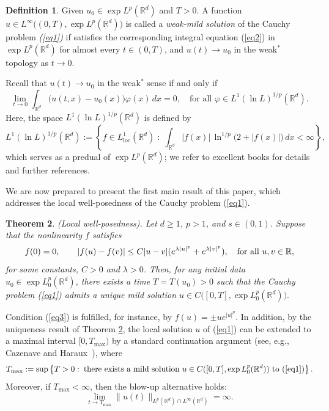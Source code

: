 \documentclass[a4paper,11pt]{amsart}
\renewcommand\eqref[1]{(\ref{#1})} %
\numberwithin{equation}{section}
\theoremstyle{plain}
\newtheorem{theorem}{Theorem}[section]
\theoremstyle{definition}
\newtheorem{definition}[theorem]{Definition}
\begin{document}
\begin{definition}
Given $u_0 \in \exp L^p(\mathbb{R}^d)$ and $T>0$. A function $u \in L^\infty\big((0,T),\exp L^p(\mathbb{R}^d)\big)
$ is called a {\it weak-mild solution} of the Cauchy problem \emph{(\ref{eq1})} if satisfies the corresponding integral equation \eqref{eq2} in $\exp L^p(\mathbb{R}^d)$ for almost every $t\in(0,T)$, and
$u(t) \rightarrow u_0$ in the weak$^{*}$ topology  as $t \to 0$.
\end{definition}
Recall that $u(t)\to u_0$ in the weak$^{*}$ sense if and only if
\[
\lim_{t\to 0}\int_{\mathbb{R}^d}\big(u(t,x)-u_0(x)\big)\varphi(x)\,dx = 0,
\quad \text{for all } \varphi \in L^1(\ln L)^{1/p}(\mathbb{R}^d).
\]
Here, the space $L^1(\ln L)^{1/p}(\mathbb{R}^d)$ is defined by
\[
L^1(\ln L)^{1/p}(\mathbb{R}^d)
:= \left\{ f\in L^1_{\mathrm{loc}}(\mathbb{R}^d) \; : \;
\int_{\mathbb{R}^d} |f(x)|\,\ln^{1/p}\!\big(2+|f(x)|\big)\,dx < \infty \right\},
\]
which serves as a predual of $\exp L^p(\mathbb{R}^d)$; we refer to excellent books \cite{Bennett,Rao} for details and further references. 

We are now prepared to present the first main result of this paper, which addresses the local well-posedness of the Cauchy problem \eqref{eq1}. 
\begin{theorem}\label{theo1}\textup{(Local well-posedness)}. Let $d\ge 1$, $p>1$, and $s \in (0, 1)$. Suppose that the nonlinearity $f$ satisfies
 \begin{equation}\label{eq3}
  f(0)=0,\qquad |f(u)-f(v)|\leq C|u-v|(e^{\lambda |u|^p}+e^{\lambda |v|^p}),\quad \hbox{for all}\,\, u,v\in\mathbb{R}, 
  \end{equation} 
 for some constants, $C>0$ and $\lambda>0$. Then, for any initial data
$u_0 \in \exp L^p_0(\mathbb{R}^d)$, there exists a time $T=T(u_0)>0$ such that the Cauchy problem  \emph{(\ref{eq1})} admits a unique mild solution
$
u \in C\big([0,T],\exp L^p_0(\mathbb{R}^d)\big).
$
\end{theorem}
Condition \eqref{eq3} is fulfilled, for instance, by $f(u)=\pm u e^{|u|^p}$. In addition, by the uniqueness result of Theorem \ref{theo1}, the local solution $u$ of \eqref{eq1} 
can be extended to a maximal interval $[0,T_{\max})$ 
by a standard continuation argument 
(see, e.g., Cazenave and Haraux~\cite{CH}), where
\[
T_{\max}
:=
\sup\left\{
T>0  : \;
\text{there exists a mild solution }
u\in C([0,T],\exp L^p_0(\mathbb{R}^d))
\text{ to \eqref{eq1}}
\right\}
.
\]
Moreover, if $T_{\max}<\infty$, then the blow-up alternative holds:
\[
\lim_{t\to T_{\max}}
\|u(t)\|_{L^p(\mathbb{R}^d)\cap L^\infty(\mathbb{R}^d)}
=\infty.
\]
\end{document}
